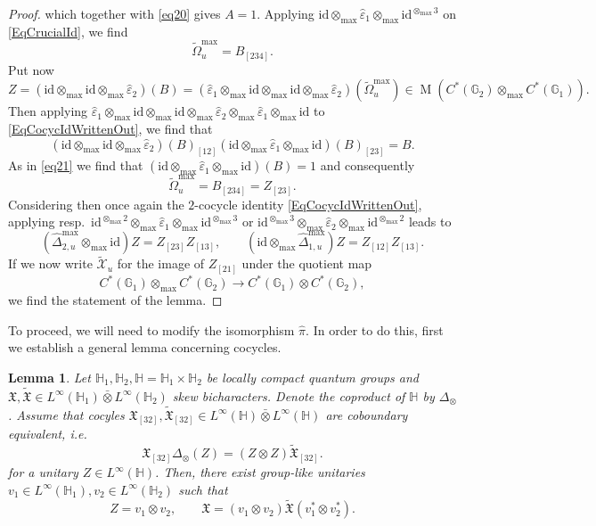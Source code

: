 \documentclass[reqno]{amsart}
\numberwithin{equation}{section}
\newtheorem{Lem}[Theorem]{Lemma}
\newcommand{\id}{\mathrm{id}}
\newcommand{\G}{\mathbb{G}}
\newcommand{\Hh}{\mathbb{H}}
\newcommand{\mcX}{\mathcal{X}}
\newcommand{\eps}{\varepsilon}
\newcommand{\Mult}{\operatorname{M}}
\newcommand{\mf}{\mathfrak}
\begin{document}
\begin{proof}
which together with \eqref{eq20} gives $A=1$.
Applying $\id\otimes_{\max} \hat{\varepsilon}_1\otimes_{\max} \id^{\otimes_{\max} 3}$ on \eqref{EqCrucialId}, we find 
\[
\widetilde{\Omega}_{u}^{\max} = B_{[234]}.
\]
Put now 
\[
Z = (\id\otimes_{\max}\id\otimes_{\max} \hat{\varepsilon}_2)(B) = 
 (\hat{\varepsilon}_1
 \otimes_{\max}\id
 \otimes_{\max}\id
 \otimes_{\max} \hat{\varepsilon}_2)(\widetilde{\Omega}_u^{\max}) \in \Mult(C^*(\G_2)\otimes_{\max}C^*(\G_1)). 
\]
Then applying $\hat{\eps}_1\otimes_{\max}\id\otimes_{\max}\id\otimes_{\max} \hat{\varepsilon}_2 \otimes_{\max} \hat{\varepsilon}_1\otimes_{\max} \id$ to \eqref{EqCocycIdWrittenOut}, we find that
\[
(\id\otimes_{\max}\id\otimes_{\max}\hat{\eps}_2)(B)_{[12]} 
(\id\otimes_{\max}\hat{\eps}_1\otimes_{\max}\id )(B)_{[23]}=
B.
\]
As in \eqref{eq21} we find that $(\id\otimes_{\max}\hat{\eps}_1\otimes_{\max}\id)(B)=1$ and consequently
\[
\widetilde{\Omega}_u^{\max}= B_{[234]} = Z_{[23]}. 
\]
Considering then once again the $2$-cocycle identity \eqref{EqCocycIdWrittenOut}, applying resp.~$\id^{\otimes_{\max} 2}\otimes_{\max} \hat{\varepsilon}_1\otimes_{\max} \id^{\otimes_{\max} 3}$ or $\id^{\otimes_{\max} 3}\otimes_{\max} \hat{\varepsilon}_2\otimes_{\max} \id^{\otimes_{\max} 2}$ leads to 
\[
(\hat{\Delta}_{2,u}^{\max}\otimes_{\max}\id)Z = Z_{[23]}Z_{[13]},\qquad (\id\otimes_{\max} \hat{\Delta}_{1,u}^{\max})Z = Z_{[12]}Z_{[13]}. 
\]
If we now write $\widetilde{\mcX}_u$ for the image of $Z_{[21]}$ under the quotient map 
\[
C^*(\G_1)\otimes_{\max}C^*(\G_2)\rightarrow C^*(\G_1)\otimes C^*(\G_2),
\]
we find the statement of the lemma.
\end{proof}

To proceed, we will need to modify the isomorphism $\hat{\pi}$. In order to do this, first we establish a general lemma concerning cocycles.

\begin{Lem}\label{lemma6}
Let $\Hh_1,\Hh_2, \Hh=\Hh_1\times \Hh_2$ be locally compact quantum groups and $\mf{X},\widetilde{\mf{X}}\in L^{\infty}(\Hh_1)\bar\otimes L^{\infty}(\Hh_2)$ skew bicharacters. Denote the coproduct of $\Hh$ by $\Delta_\otimes$. Assume that cocyles $\mf{X}_{[32]},\widetilde{\mf{X}}_{[32]}\in L^{\infty}(\Hh)\bar\otimes L^{\infty}(\Hh)$ are coboundary equivalent, i.e.
\begin{equation}\label{eq32}
\mf{X}_{[32]}\Delta_{\otimes }(Z)=
(Z\otimes Z)\widetilde{\mf{X}}_{[32]}.
\end{equation}
for a unitary $Z\in L^{\infty}(\Hh)$. Then, there exist group-like unitaries $v_1\in L^{\infty}(\Hh_1),v_2\in L^{\infty}(\Hh_2)$ such that 
\[
Z=v_1\otimes v_2,\qquad \mf{X}=(v_1\otimes v_2)\widetilde{\mf{X}} (v_1^*\otimes v_2^*).
\]
\end{Lem}
\end{document}
